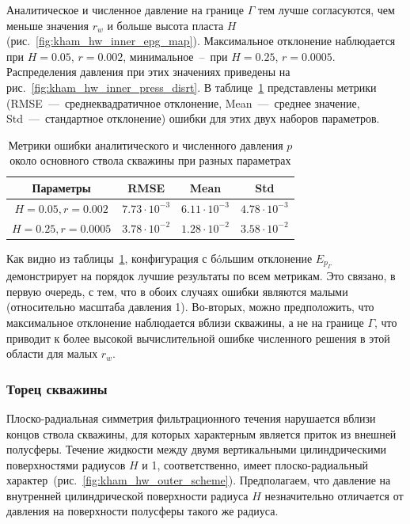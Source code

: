 \documentclass{article}
\begin{document}
Аналитическое и численное давление на границе $\Gamma$ тем лучше согласуются, чем меньше
значения $r_w$ и больше высота пласта $H$ (рис.~\ref{fig:kham_hw_inner_epg_map}).
Максимальное отклонение наблюдается при $H = 0.05$, $r = 0.002$,
минимальное~--~при $H = 0.25$, $r = 0.0005$. Распределения давления при
этих значениях приведены на рис.~\ref{fig:kham_hw_inner_press_disrt}.
В таблице~\ref{tab:kham_hw_inner_p_error_metrics} представлены метрики~\cite{lit:kham_kolmogorov1974}
(RMSE~---~среднеквадратичное отклонение, Mean~---~среднее значение, Std~---~стандартное отклонение) ошибки
для этих двух наборов параметров.

\begin{table}[H]
	\centering
	\caption{
		Метрики ошибки аналитического и численного давления $p$ около основного ствола скважины
		при разных параметрах
	}
	\label{tab:kham_hw_inner_p_error_metrics}
	\begin{tabular}{|c|c|c|c|} %
		\hline %
		\textbf{Параметры} & \textbf{RMSE}        & \textbf{Mean}        & \textbf{Std}         \\
		\hline %
		$H=0.05, r=0.002$  & $7.73 \cdot 10^{-3}$ & $6.11 \cdot 10^{-3}$ & $4.78 \cdot 10^{-3}$ \\
		\hline %
		$H=0.25, r=0.0005$ & $3.78 \cdot 10^{-2}$ & $1.28 \cdot 10^{-2}$ & $3.58 \cdot 10^{-2}$ \\
		\hline %
	\end{tabular}
\end{table}

Как видно из таблицы~\ref{tab:kham_hw_inner_p_error_metrics}, конфигурация
с б\'{o}льшим отклонение $E_{p_{\Gamma}}$ демонстрирует на порядок лучшие результаты по всем
метрикам. Это связано, в первую очередь, с тем, что в обоих случаях ошибки являются
малыми (относительно масштаба давления 1). Во-вторых, можно предположить, что максимальное
отклонение наблюдается вблизи скважины, а не на границе $\Gamma$, что приводит к более высокой
вычислительной ошибке численного решения в этой области для малых $r_w$.

\subsubsection{Торец скважины}

Плоско-радиальная симметрия фильтрационного течения нарушается вблизи концов
ствола скважины, для которых характерным является приток из внешней полусферы.
Течение жидкости между двумя вертикальными цилиндрическими поверхностями
радиусов $H$ и 1, соответственно, имеет плоско-радиальный характер~(рис.~\ref{fig:kham_hw_outer_scheme}).
Предполагаем, что давление на внутренней цилиндрической поверхности радиуса $H$ незначительно
отличается от давления на поверхности полусферы такого же радиуса.
\end{document}
